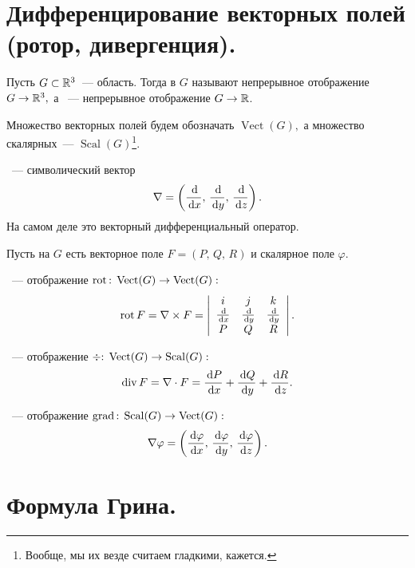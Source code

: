 \documentclass{notes}
\DeclareMathOperator{\Vect}{Vect}
\DeclareMathOperator{\Scal}{Scal}
\begin{document}
\section{Дифференцирование векторных полей \\ (ротор, дивергенция).}

	\begin{de}
		Пусть $G \subset \mathbb{R}^3$~--- область. Тогда  в $G$ называют непрерывное отображение $G \to \mathbb{R}^3,$ а ~--- непрерывное отображение $G \to \mathbb{R}$.
	\end{de}

	\begin{de}
		Множество векторных полей будем обозначать $\Vect(G),$ а множество скалярных~--- $\Scal(G)$\footnote{Вообще, мы их везде считаем гладкими, кажется.}.
	\end{de}

	\begin{de}
		~--- символический вектор
		\[
			\nabla = \left(\dfrac{\, \mathrm{d}}{\, \mathrm{d} x}, \, \dfrac{\, \mathrm{d}}{\, \mathrm{d} y}, \, \dfrac{\, \mathrm{d}}{\, \mathrm{d} z}\right).
		\]
		На самом деле это векторный дифференциальный оператор.
	\end{de}

	Пусть на $G$ есть векторное поле $F = (P, \, Q, \, R)$ и скалярное поле $\varphi$. 

	\begin{de}
		~--- отображение $\rot\col \; \Vect(G) \to \Vect(G):$
		\[
			\operatorname{rot} F = \nabla \times F = \left|\begin{array}{ccc}
				i & j & k \\
				\tfrac{\, \mathrm{d}}{\, \mathrm{d} x} & \tfrac{\, \mathrm{d}}{\, \mathrm{d} y} & \tfrac{\, \mathrm{d}}{\, \mathrm{d} y} \\
				P & Q & R
			\end{array}\right|.
		\]
	\end{de}

	\begin{de}
		~--- отображение $\div\col \; \Vect(G) \to \Scal(G):$
		\[
			\operatorname{div} F = \nabla \cdot F = \dfrac{\, \mathrm{d} P}{\, \mathrm{d} x} + \dfrac{\, \mathrm{d} Q}{\, \mathrm{d} y} + \dfrac{\, \mathrm{d} R}{\, \mathrm{d} z}.
		\]
	\end{de}

	\begin{de}
		~--- отображение $\grad\col \; \Scal(G) \to \Vect(G):$
		\[
			\nabla \varphi = \left(\dfrac{\, \mathrm{d} \varphi}{\, \mathrm{d} x}, \, \dfrac{\, \mathrm{d} \varphi}{\, \mathrm{d} y}, \, \dfrac{\, \mathrm{d} \varphi}{\, \mathrm{d} z}\right).
		\]
	\end{de}

\section{Формула Грина.}
\end{document}

